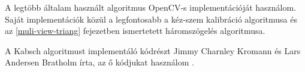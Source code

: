 	A legtöbb általam használt algoritmus OpenCV-s implementációját használom. Saját implementációk közül a legfontosabb a kéz-szem kalibráció algoritmusa és az \ref{muli-view-triang} fejezetben ismertetett háromszögelés algoritmusa. 
		
	A Kabsch algoritmust implementáló kódrészt Jimmy Charnley Kromann és Lars Andersen Bratholm írta, az ő kódjukat használom \cite{kabschGithub}.
	